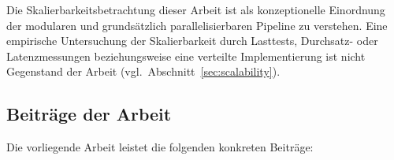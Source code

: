 Die Skalierbarkeitsbetrachtung dieser Arbeit ist als konzeptionelle Einordnung
der modularen und grundsätzlich parallelisierbaren Pipeline zu verstehen.
Eine empirische Untersuchung der Skalierbarkeit durch Lasttests, Durchsatz- oder
Latenzmessungen beziehungsweise eine verteilte Implementierung ist nicht
Gegenstand der Arbeit (vgl.\ Abschnitt~\ref{sec:scalability}).

\subsection{Beiträge der Arbeit}

Die vorliegende Arbeit leistet die folgenden konkreten Beiträge:

